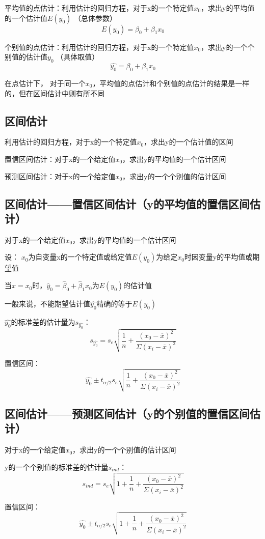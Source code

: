 \documentclass[UTF8,10pt]{book}
\begin{document}
平均值的点估计：利用估计的回归方程，对于x的一个特定值$x_0$，求出y的平均值的一个估计值$E(y_0)$ （总体参数） 
$$E(y_0) = \beta_0 + \beta_1 x_0 $$

个别值的点估计：利用估计的回归方程，对于x的一个特定值$x_0$，求出y的一个个别值的估计值$y_0$ （具体取值） 
$$\hat{y_0} = \beta_0 + \beta_1 x_0 $$ 

在点估计下， 对于同一个$x_0$，平均值的点估计和个别值的点估计的结果是一样的，但在区间估计中则有所不同

\subsection{区间估计}	
利用估计的回归方程，对于x的一个特定值$x_0$，求出y的一个估计值的区间 

置信区间估计：对于x的一个给定值$x_0$，求出y的平均值的一个估计区间

预测区间估计：对于x的一个给定值$x_0$，求出y的一个个别值的估计区间

\subsection{区间估计——置信区间估计（y的平均值的置信区间估计）}	
对于x的一个给定值$x_0$，求出y的平均值的一个估计区间 

设： $x_0$为自变量x的一个特定值或给定值$E(y_0)$为给定$x_0$时因变量y的平均值或期望值

当$x=x_0$时，$\hat{y}_0 = \hat{\beta}_0+\hat{\beta}_1 x_0$为$E(y_0)$的估计值 

一般来说，不能期望估计值$\hat{y_0}$精确的等于$E(y_0)$ 

$\hat{y_0}$的标准差的估计量为$s_{\hat{y_0}}$： 
$$ s_{\hat{y_0}} = s_e \sqrt{\frac{1}{n} + \frac{(x_0 - \overline{x})^2}{\Sigma (x_i - \overline{x})^2}} $$ 

置信区间： 
$$ \hat{y_0} \pm t_{\alpha / 2} s_e \sqrt{ \frac{1}{n} + \frac{(x_0 - \overline{x})^2}{\Sigma (x_i - \overline{x})^2}} $$

\subsection{区间估计——预测区间估计（y的个别值的置信区间估计）}	
对于x的一个给定值$x_0$，求出y的一个个别值的估计区间 

y的一个个别值的标准差的估计量$s_{ind}$： 
$$ s_{ind} = s_e \sqrt{1+\frac{1}{n} + \frac{(x_0 - \overline{x})^2}{\Sigma (x_i - \overline{x})^2}} $$ 

置信区间： 
$$ \hat{y_0} \pm t_{\alpha / 2} s_e \sqrt{1+ \frac{1}{n} + \frac{(x_0 - \overline{x})^2}{\Sigma (x_i - \overline{x})^2}} $$
\end{document}
